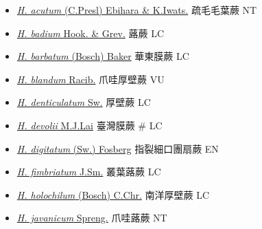 \begin{itemize}
  \begin{itemize}
        \item[] \href{http://www.theplantlist.org/tpl1.1/search?q=Hymenophyllum+acutum}{\textit{H. acutum} (C.Presl) Ebihara \& K.Iwats.}   疏毛毛葉蕨   NT
        \item[] \href{http://www.theplantlist.org/tpl1.1/search?q=Hymenophyllum+badium}{\textit{H. badium} Hook. \& Grev.}   蕗蕨   LC
        \item[] \href{http://www.theplantlist.org/tpl1.1/search?q=Hymenophyllum+barbatum}{\textit{H. barbatum} (Bosch) Baker}   華東膜蕨   LC
        \item[] \href{http://www.theplantlist.org/tpl1.1/search?q=Hymenophyllum+blandum}{\textit{H. blandum} Racib.}   爪哇厚壁蕨   VU
        \item[] \href{http://www.theplantlist.org/tpl1.1/search?q=Hymenophyllum+denticulatum}{\textit{H. denticulatum} Sw.}   厚壁蕨   LC
        \item[] \href{http://www.theplantlist.org/tpl1.1/search?q=Hymenophyllum+devolii}{\textit{H. devolii} M.J.Lai}   臺灣膜蕨  \# LC
        \item[] \href{http://www.theplantlist.org/tpl1.1/search?q=Hymenophyllum+digitatum}{\textit{H. digitatum} (Sw.) Fosberg}   指裂細口團扇蕨   EN
        \item[] \href{http://www.theplantlist.org/tpl1.1/search?q=Hymenophyllum+fimbriatum}{\textit{H. fimbriatum} J.Sm.}   叢葉蕗蕨   LC
        \item[] \href{http://www.theplantlist.org/tpl1.1/search?q=Hymenophyllum+holochilum}{\textit{H. holochilum} (Bosch) C.Chr.}   南洋厚壁蕨   LC
        \item[] \href{http://www.theplantlist.org/tpl1.1/search?q=Hymenophyllum+javanicum}{\textit{H. javanicum} Spreng.}   爪哇蕗蕨   NT

\end{itemize}
\end{itemize}
